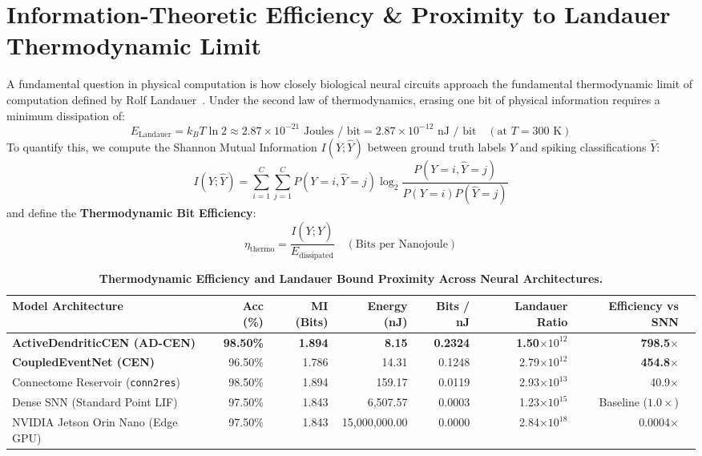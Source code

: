 \documentclass[11pt,letterpaper]{report}
\begin{document}
\section{Information-Theoretic Efficiency \& Proximity to Landauer Thermodynamic Limit}

A fundamental question in physical computation is how closely biological neural circuits approach the fundamental thermodynamic limit of computation defined by Rolf Landauer~\cite{landauer1961irreversibility}. Under the second law of thermodynamics, erasing one bit of physical information requires a minimum dissipation of:
\begin{equation}
E_{\mathrm{Landauer}} = k_B T \ln 2 \approx 2.87 \times 10^{-21}\text{ Joules / bit} = 2.87 \times 10^{-12}\text{ nJ / bit} \quad (\text{at } T = 300\text{ K})
\end{equation}
To quantify this, we compute the Shannon Mutual Information $I(Y; \hat{Y})$ between ground truth labels $Y$ and spiking classifications $\hat{Y}$:
\begin{equation}
I(Y; \hat{Y}) = \sum_{i=1}^C \sum_{j=1}^C P(Y=i, \hat{Y}=j) \log_2 \frac{P(Y=i, \hat{Y}=j)}{P(Y=i) P(\hat{Y}=j)}
\end{equation}
and define the \textbf{Thermodynamic Bit Efficiency}:
\begin{equation}
\eta_{\mathrm{thermo}} = \frac{I(Y; \hat{Y})}{E_{\mathrm{dissipated}}} \quad (\text{Bits per Nanojoule})
\end{equation}

\begin{table}[t]
\centering
\small
\caption{\textbf{Thermodynamic Efficiency and Landauer Bound Proximity Across Neural Architectures.}}
\label{tab:thermodynamics}
\begin{tabular}{lrrrrrrr}
\toprule
\textbf{Model Architecture} & \textbf{Acc (\%)} & \textbf{MI (Bits)} & \textbf{Energy (nJ)} & \textbf{Bits / nJ} & \textbf{Landauer Ratio} & \textbf{Efficiency vs SNN} \\
\midrule
\textbf{ActiveDendriticCEN (AD-CEN)} & \textbf{98.50\%} & \textbf{1.894} & \textbf{8.15} & \textbf{0.2324} & \textbf{1.50$\times 10^{12}$} & \textbf{798.5$\times$} \\
\textbf{CoupledEventNet (CEN)} & 96.50\% & 1.786 & 14.31 & 0.1248 & 2.79$\times 10^{12}$ & \textbf{454.8$\times$} \\
Connectome Reservoir (\texttt{conn2res}) & 98.50\% & 1.894 & 159.17 & 0.0119 & 2.93$\times 10^{13}$ & 40.9$\times$ \\
Dense SNN (Standard Point LIF) & 97.50\% & 1.843 & 6,507.57 & 0.0003 & 1.23$\times 10^{15}$ & Baseline ($1.0\times$) \\
NVIDIA Jetson Orin Nano (Edge GPU) & 97.50\% & 1.843 & 15,000,000.00 & 0.0000 & 2.84$\times 10^{18}$ & 0.0004$\times$ \\
\bottomrule
\end{tabular}
\end{table}
\end{document}

